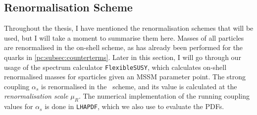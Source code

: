 \documentclass[../main.tex]{subfiles}
\begin{document}
\subsection{Renormalisation Scheme}
\label{res:subsec:renormalisation_scheme}
Throughout the thesis, I have mentioned the renormalisation schemes that will be used, but I will take a moment to summarise them here.
Masses of all particles are renormalised in the on-shell scheme, as has already been performed for the quarks in \cref{pc:subsec:counterterms}.
Later in this section, I will go through our usage of the spectrum calculator \verb|FlexibleSUSY|, which calculates on-shell renormalised masses for sparticles given an MSSM parameter point.
The strong coupling \(\alpha_s\) is renormalised in the \MSbar\ scheme, and its value is calculated at the \emph{renormalisation scale} \(\mu_R\).
The numerical implementation of the running coupling values for \(\alpha_s\) is done in \verb|LHAPDF|, which we also use to evaluate the PDFs.
\end{document}
